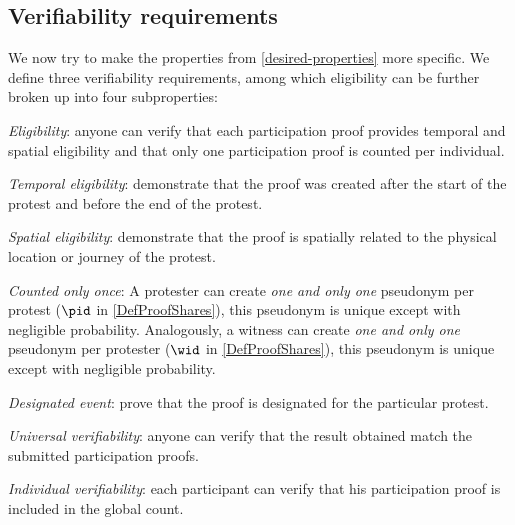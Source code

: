 \subsection{Verifiability requirements}%
\label{verifiability-properties}

We now try to make the properties from \cref{desired-properties} more 
specific.
We define three verifiability requirements, among which eligibility can be 
further broken up into four subproperties:
\begin{requirements}[V]
  \item\label{EligibilityVerif} \emph{Eligibility}: anyone can verify that each participation proof provides temporal and spatial eligibility and that only one participation proof is counted per individual.
    \begin{requirements}

    \item\label{TemporallyRelated} \emph{Temporal eligibility}: demonstrate that the proof was created after the start of the protest and before the end of the protest.

    \item\label{SpatiallyRelated} \emph{Spatial eligibility}: demonstrate that the proof is spatially related to the physical location or journey of the protest.

    \item\label{CountOnce} \emph{Counted only once}:
      A protester can create \emph{one and only one} pseudonym per protest 
      (\(\pid\) in \cref{DefProofShares}), this pseudonym is unique except with 
      negligible probability.
      Analogously, a witness can create \emph{one and only one} pseudonym per 
      protester (\(\wid\) in \cref{DefProofShares}), this pseudonym is unique 
      except with negligible probability.

    \item\label{DesignatedEvent} \emph{Designated event}: prove that the proof 
      is designated for the particular protest.

    \end{requirements}

  \item\label{UniversalVerif} \emph{Universal verifiability}: anyone can verify that the result obtained match the submitted participation proofs.

  \item\label{IndividualVerif} \emph{Individual verifiability}: each participant can verify that his participation proof is included in the global count.
\end{requirements}

